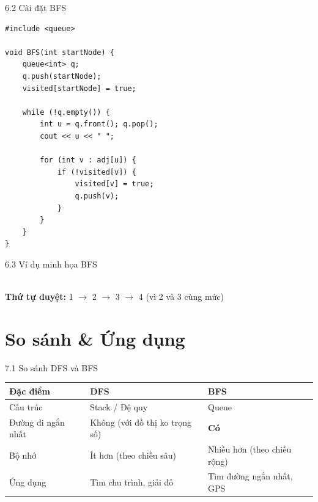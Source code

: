\documentclass[aspectratio=169]{beamer}
\begin{document}
\begin{frame}[fragile]{6.2 Cài đặt BFS}
\begin{lstlisting}
#include <queue>

void BFS(int startNode) {
    queue<int> q;
    q.push(startNode);
    visited[startNode] = true;

    while (!q.empty()) {
        int u = q.front(); q.pop();
        cout << u << " ";

        for (int v : adj[u]) {
            if (!visited[v]) {
                visited[v] = true;
                q.push(v);
            }
        }
    }
}
\end{lstlisting}
\end{frame}

\begin{frame}{6.3 Ví dụ minh họa BFS}
    \centering
    \\ \textbf{Thứ tự duyệt:} 1 $\to$ 2 $\to$ 3 $\to$ 4 (vì 2 và 3 cùng mức)
\end{frame}

\section{So sánh & Ứng dụng}
\begin{frame}{7.1 So sánh DFS và BFS}
    \begin{table}
        \begin{tabular}{|l|l|l|}
            \hline
            \textbf{Đặc điểm} & \textbf{DFS} & \textbf{BFS} \\ \hline
            Cấu trúc & Stack / Đệ quy & Queue \\ \hline
            Đường đi ngắn nhất & Không (với đồ thị ko trọng số) & \textbf{Có} \\ \hline
            Bộ nhớ & Ít hơn (theo chiều sâu) & Nhiều hơn (theo chiều rộng) \\ \hline
            Ứng dụng & Tìm chu trình, giải đố & Tìm đường ngắn nhất, GPS \\ \hline
        \end{tabular}
    \end{table}
\end{frame}
\end{document}

